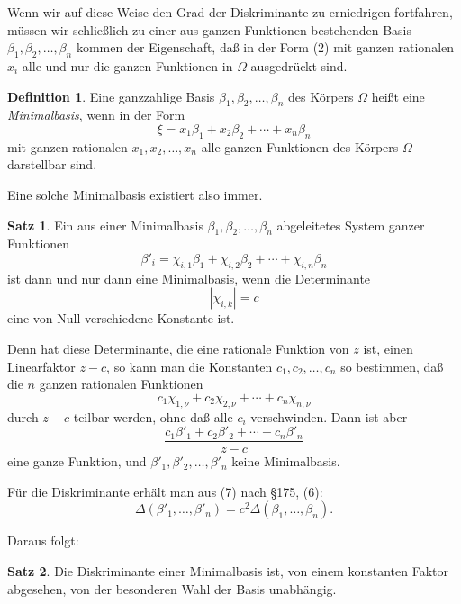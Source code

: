 \documentclass[12pt,a4paper]{article}
\theoremstyle{definition}
\newtheorem{defin}{Definition}[section]
\newtheorem{satz}{Satz}[section]
\begin{document}
Wenn wir auf diese Weise den Grad der Diskriminante zu erniedrigen fortfahren, müssen wir schließlich zu einer aus ganzen Funktionen bestehenden Basis $\beta_1, \beta_2, \ldots, \beta_n$ kommen der Eigenschaft, daß in der Form (2) mit ganzen rationalen $x_i$ alle und nur die ganzen Funktionen in $\Omega$ ausgedrückt sind.

\begin{defin}
Eine ganzzahlige Basis $\beta_1, \beta_2, \ldots, \beta_n$ des Körpers $\Omega$ heißt eine \emph{Minimalbasis}, wenn in der Form
\begin{equation}
\xi = x_1\beta_1 + x_2\beta_2 + \cdots + x_n\beta_n
\end{equation}
mit ganzen rationalen $x_1, x_2, \ldots, x_n$ alle ganzen Funktionen des Körpers $\Omega$ darstellbar sind.
\end{defin}

Eine solche Minimalbasis existiert also immer.

\begin{satz}
Ein aus einer Minimalbasis $\beta_1, \beta_2, \ldots, \beta_n$ abgeleitetes System ganzer Funktionen
\begin{equation}
\beta'_i = \chi_{i,1}\beta_1 + \chi_{i,2}\beta_2 + \cdots + \chi_{i,n}\beta_n
\end{equation}
ist dann und nur dann eine Minimalbasis, wenn die Determinante
\begin{equation}
|\chi_{i,k}| = c
\end{equation}
eine von Null verschiedene Konstante ist.
\end{satz}

Denn hat diese Determinante, die eine rationale Funktion von $z$ ist, einen Linearfaktor $z - c$, so kann man die Konstanten $c_1, c_2, \ldots, c_n$ so bestimmen, daß die $n$ ganzen rationalen Funktionen
\[c_1\chi_{1,\nu} + c_2\chi_{2,\nu} + \cdots + c_n\chi_{n,\nu}\]
durch $z - c$ teilbar werden, ohne daß alle $c_i$ verschwinden. Dann ist aber
\[\frac{c_1\beta'_1 + c_2\beta'_2 + \cdots + c_n\beta'_n}{z - c}\]
eine ganze Funktion, und $\beta'_1, \beta'_2, \ldots, \beta'_n$ keine Minimalbasis.

Für die Diskriminante erhält man aus (7) nach \S 175, (6):
\begin{equation}
\Delta(\beta'_1, \ldots, \beta'_n) = c^2 \Delta(\beta_1, \ldots, \beta_n).
\end{equation}

Daraus folgt:
\begin{satz}
Die Diskriminante einer Minimalbasis ist, von einem konstanten Faktor abgesehen, von der besonderen Wahl der Basis unabhängig.
\end{satz}
\end{document}
